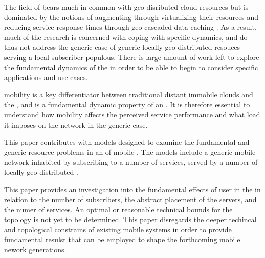 The field of \xcloud bears much in common with geo-disributed cloud resources but is dominated by the notions of augmenting \ues through virtualizing their resources \cite{6563280} and reducing service response times through geo-cascaded data caching \cite{1437087,ericsson_akami}. As a result, much of the research is concerned with coping with specific dynamics, and do thus not address the generic case of generic locally geo-distributed resouces serving a local subscriber populous. There is large amount of work left to explore the fundamental dynamics of the \xcloud in order to be able to begin to consider specific applications and use-cases.

\Ue mobility is a key differentiator between traditional distant immobile clouds and the \xcloud, and is a fundamental dynamic property of an \xcloud. It is therefore essential to understand how \ue mobility affects the perceived service performance and what load it imposes on the network in the generic case.

This paper contributes with models designed to examine the fundamental and generic resource problems in an \xcloud of mobile \ues. The models include a generic mobile network inhabited by \ues subscribing to a number of services, served by a number of locally geo-distributed \dcs.

This paper provides an investigation into the fundamental effects of user \ue in the \xcloud in relation to the number of subscribers, the abstract placement of the servers, and the numer of services. An optimal or reasonable technical bounds for the \xcloud topology is not yet to be determined. This paper disregards the deeper techincal and topological constrains of existing mobile systems in order to provide fundamental resulst that can be employed to shape the forthcoming mobile nework generations.
